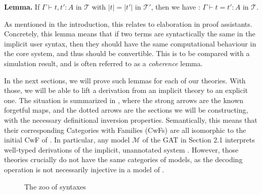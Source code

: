 \textbf{Lemma.} If $\Gamma \vdash t,t' : A$ in $\mathcal{T}$ with $|t| = |t'|$ in $\mathcal{T}'$, then we have : $\Gamma \vdash t = t' : A$ in $\mathcal{T}$.\\

\begin{remark}As mentioned in the introduction, this relates to elaboration in proof assistants. 
Concretely, this lemma means that if two terms are syntactically the same in the implicit user syntax, then they should have the same
computational behaviour in the core system, and thus should be convertible. This is to be compared with a simulation
result, and is often referred to as a \emph{coherence} lemma.
\end{remark}

In the next sections, we will prove such lemmas for each of our theories. With those, we will be able to lift a derivation from an implicit theory to an explicit one.
The situation is summarized in , where the strong arrows are the known forgetful maps, and the dotted arrows are the sections we will be constructing, with the necessary definitional inversion properties.
Semantically, this means that their corresponding Categories with Families (CwFs) are all isomorphic to the initial CwF of \ThyGAT.
In particular, any model $\mathcal{M}$ of the GAT in Section 2.1 interprets well-typed derivations of the implicit, unannotated system \ThyPTS. However, those theories crucially do not have the same categories of models, as the decoding operation is not necessarily injective in a model of \ThyGAT. 

\begin{figure}[!ht]
\centering
{}%

\caption{The zoo of syntaxes}
\label{hierarchy-zoo}
\end{figure}

